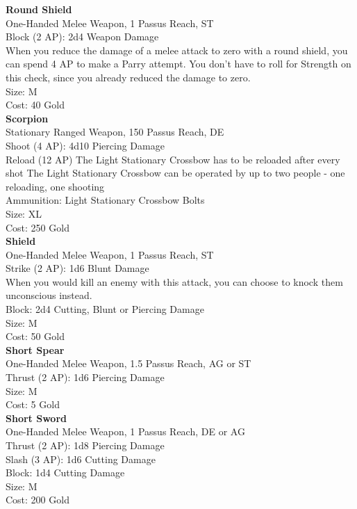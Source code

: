 \textbf{Round Shield}\\
One-Handed Melee Weapon, 1 Passus Reach, ST\\
Block (2 AP): 2d4 Weapon Damage\\
When you reduce the damage of a melee attack to zero with a round shield, you can spend 4 AP to make a Parry attempt. You don't have to roll for Strength on this check, since you already reduced the damage to zero.\\
Size: M\\
Cost: 40 Gold\\


\textbf{Scorpion}\\
Stationary Ranged Weapon, 150 Passus Reach, DE\\
Shoot (4 AP): 4d10 Piercing Damage\\
Reload (12 AP) The Light Stationary Crossbow has to be reloaded after every shot
The Light Stationary Crossbow can be operated by up to two people - one reloading, one shooting\\
Ammunition: Light Stationary Crossbow Bolts\\
Size: XL\\
Cost: 250 Gold\\


\textbf{Shield}\\
One-Handed Melee Weapon, 1 Passus Reach, ST\\
Strike (2 AP): 1d6 Blunt Damage\\
When you would kill an enemy with this attack, you can choose to knock them unconscious instead.\\
Block: 2d4 Cutting, Blunt or Piercing Damage\\
Size: M\\
Cost: 50 Gold\\


\textbf{Short Spear}\\
One-Handed Melee Weapon, 1.5 Passus Reach, AG or ST\\
Thrust (2 AP): 1d6 Piercing Damage\\
Size: M\\
Cost: 5 Gold\\


\textbf{Short Sword}\\
One-Handed Melee Weapon, 1 Passus Reach, DE or AG\\
Thrust (2 AP): 1d8 Piercing Damage\\
Slash (3 AP): 1d6 Cutting Damage\\
Block: 1d4 Cutting Damage\\
Size: M\\
Cost: 200 Gold\\


